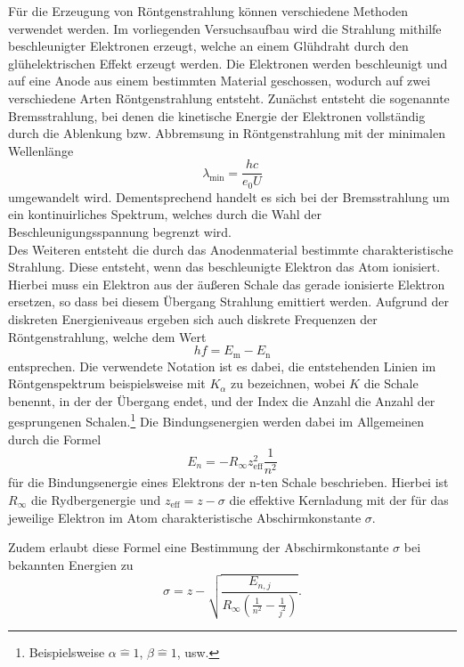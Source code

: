 Für die Erzeugung von Röntgenstrahlung können verschiedene Methoden verwendet werden.
Im vorliegenden Versuchsaufbau wird die Strahlung mithilfe beschleunigter Elektronen erzeugt, welche an einem Glühdraht durch den glühelektrischen Effekt erzeugt werden.
Die Elektronen werden beschleunigt und auf eine Anode aus einem bestimmten Material geschossen, wodurch auf zwei verschiedene Arten Röntgenstrahlung entsteht.
Zunächst entsteht die sogenannte Bremsstrahlung, bei denen die kinetische Energie der Elektronen vollständig durch die Ablenkung bzw. Abbremsung in Röntgenstrahlung mit der minimalen Wellenlänge
\begin{equation}
  \lambda_{\text{min}} = \frac{h c}{e_0 U}
\end{equation}
umgewandelt wird.
Dementsprechend handelt es sich bei der Bremsstrahlung um ein kontinuirliches Spektrum, welches durch die Wahl der Beschleunigungsspannung begrenzt wird.\\
Des Weiteren entsteht die durch das Anodenmaterial bestimmte charakteristische Strahlung.
Diese entsteht, wenn das beschleunigte Elektron das Atom ionisiert.
Hierbei muss ein Elektron aus der äußeren Schale das gerade ionisierte Elektron ersetzen, so dass bei diesem Übergang Strahlung emittiert werden.
Aufgrund der diskreten Energieniveaus ergeben sich auch diskrete Frequenzen der Röntgenstrahlung, welche dem Wert
\begin{equation}
  h f = E_{\text{m}} - E_{\text{n}}
\end{equation}
entsprechen.
Die verwendete Notation ist es dabei, die entstehenden Linien im Röntgenspektrum beispielsweise mit $K_{\alpha}$ zu bezeichnen, wobei $K$ die Schale benennt, in der der Übergang endet, und der Index die Anzahl die Anzahl der gesprungenen Schalen.\footnote{Beispielsweise $\alpha \hat{=} 1$, $\beta \hat{=} 1$, usw.}
Die Bindungsenergien werden dabei im Allgemeinen durch die Formel
\begin{equation}
  E_n = - R_{\infty} z_{\text{eff}}^2 \frac{1}{n^2}
\end{equation}
für die Bindungsenergie eines Elektrons der n-ten Schale beschrieben.
Hierbei ist $R_{\infty}$ die Rydbergenergie und $z_{\text{eff}} = z - \sigma$ die effektive Kernladung mit der für das jeweilige Elektron im Atom charakteristische Abschirmkonstante $\sigma$.

Zudem erlaubt diese Formel eine Bestimmung der Abschirmkonstante $\sigma$ bei bekannten Energien zu
\begin{equation}
  \sigma = z - \sqrt{ \frac{E_{n,j}}{R_{\infty} ( \frac{1}{n^2}- \frac{1}{j^2} ) } }.
  \label{eqn:sigma}
\end{equation}

